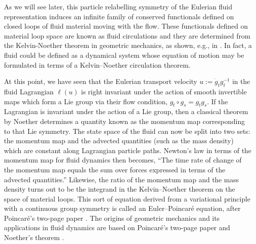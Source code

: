 \documentclass[11pt, oneside]{article}   	%
\numberwithin{equation}{section}
\theoremstyle{plain}
\theoremstyle{definition}
\theoremstyle{remark}
\newcommand{\<}{\langle}
\renewcommand{\>}{\rangle}
\begin{document}
As we will see later, this particle relabelling symmetry of the Eulerian fluid representation induces an infinite family of conserved functionals defined on closed loops of fluid material moving with the flow. These functionals defined on material loop space are known as fluid circulations and they are determined from the Kelvin-Noether theorem in geometric mechanics, as shown, e.g., in \cite{holm1998euler,cotter2013noether}. In fact, a fluid could be defined as a dynamical system whose equation of motion may be formulated in terms of a Kelvin--Noether circulation theorem.


At this point, we have seen that the Eulerian transport velocity $u := \dot{g}_t  g_t^{-1} $ in the fluid Lagrangian $\ell(u)$ is right invariant under the action of smooth invertible maps which form a Lie group via their flow condition, $g_t\circ g_s=g_tg_s$. If the Lagrangian is invariant under the action of a Lie group, then a classical theorem by Noether \cite{noether1918invariante} determines a quantity known as the momentum map  corresponding to that Lie symmetry. The state space of the fluid can now be split into two sets: the momentum map and the advected quantities (such as the mass density) which are constant along Lagrangian particle paths. Newton's law in terms of the momentum map for fluid dynamics then becomes, ``The time rate of change of the momentum map equals the sum over forces expressed in terms of the advected quantities.'' Likewise, the ratio of the momentum map and the mass density turns out to be the integrand in the Kelvin--Noether theorem on the space of material loops. This sort of equation derived from a variational principle with a continuous group symmetry is called an Euler--Poincar\'e equation, after Poincar\'e's two-page paper \cite{poincare1901forme}. The origins of geometric mechanics and its applications in fluid dynamics are based on Poincar\'e's two-page paper \cite{poincare1901forme} and Noether's theorem \cite{noether1918invariante}. 
\end{document}
